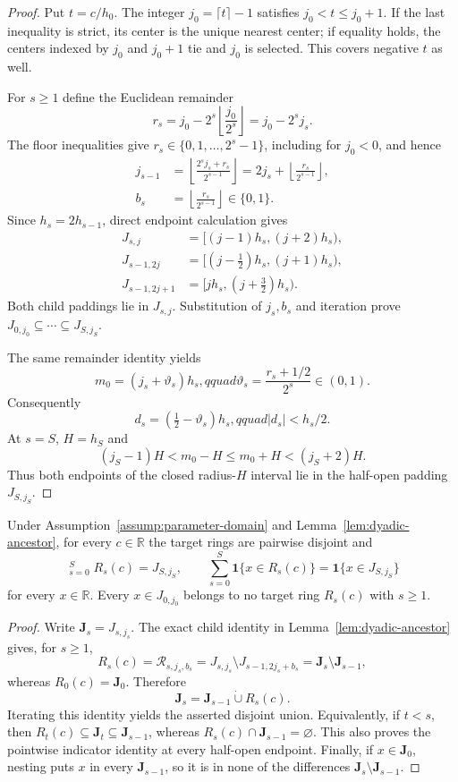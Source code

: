 \begin{proof}
Put $t=c/h_0$.  The integer $j_0=\lceil t\rceil-1$ satisfies
$j_0<t\leq j_0+1$.  If the last inequality is strict, its center is the
unique nearest center; if equality holds, the centers indexed by $j_0$ and
$j_0+1$ tie and $j_0$ is selected.  This covers negative $t$ as well.

For $s\geq1$ define the Euclidean remainder
\[
 r_s=j_0-2^s\left\lfloor\frac{j_0}{2^s}\right\rfloor
     =j_0-2^sj_s.
\]
The floor inequalities give $r_s\in\{0,1,\ldots,2^s-1\}$, including for
$j_0<0$, and hence
\[
\begin{aligned}
 j_{s-1}
 &=\left\lfloor\frac{2^sj_s+r_s}{2^{s-1}}\right\rfloor
 =2j_s+\left\lfloor\frac{r_s}{2^{s-1}}\right\rfloor,\\
 b_s&=\left\lfloor\frac{r_s}{2^{s-1}}\right\rfloor\in\{0,1\}.
\end{aligned}
\]
Since $h_s=2h_{s-1}$, direct endpoint calculation gives
\[
\begin{aligned}
 J_{s,j}&=[(j-1)h_s,(j+2)h_s),\\
 J_{s-1,2j}&=[(j-\tfrac12)h_s,(j+1)h_s),\\
 J_{s-1,2j+1}&=[jh_s,(j+\tfrac32)h_s).
\end{aligned}
\]
Both child paddings lie in $J_{s,j}$.  Substitution of $j_s,b_s$ and
iteration prove
$J_{0,j_0}\subseteq\cdots\subseteq J_{S,j_S}$.

The same remainder identity yields
\[
 m_0=(j_s+\vartheta_s)h_s,qquad
 \vartheta_s=\frac{r_s+1/2}{2^s}\in(0,1).
\]
Consequently
\[
 d_s=(\tfrac12-\vartheta_s)h_s,qquad |d_s|<h_s/2.
\]
At $s=S$, $H=h_S$ and
\[
 (j_S-1)H<m_0-H\leq m_0+H<(j_S+2)H.
\]
Thus both endpoints of the closed radius-$H$ interval lie in the half-open
padding $J_{S,j_S}$.
\end{proof}

\begin{proposition}\label{prop:ring-partition}
Under Assumption~\ref{assump:parameter-domain} and
Lemma~\ref{lem:dyadic-ancestor}, for every $c\in\mathbb R$ the target rings
are pairwise disjoint and
\[
 \mathop{\dot\bigcup}_{s=0}^S R_s(c)=J_{S,j_S},
 \qquad
 \sum_{s=0}^S\mathbf1\{x\in R_s(c)\}
 =\mathbf1\{x\in J_{S,j_S}\}
\]
for every $x\in\mathbb R$.  Every $x\in J_{0,j_0}$ belongs to no target
ring $R_s(c)$ with $s\geq1$.
\end{proposition}

\begin{proof}
Write $\mathbf J_s=J_{s,j_s}$.  The exact child identity in
Lemma~\ref{lem:dyadic-ancestor} gives, for $s\geq1$,
\[
 R_s(c)=\mathcal R_{s,j_s,b_s}
 =J_{s,j_s}\setminus J_{s-1,2j_s+b_s}
 =\mathbf J_s\setminus\mathbf J_{s-1},
\]
whereas $R_0(c)=\mathbf J_0$.  Therefore
\[
 \mathbf J_s=\mathbf J_{s-1}\mathbin{\dot\cup}R_s(c).
\]
Iterating this identity yields the asserted disjoint union.  Equivalently,
if $t<s$, then
$R_t(c)\subseteq\mathbf J_t\subseteq\mathbf J_{s-1}$, whereas
$R_s(c)\cap\mathbf J_{s-1}=\varnothing$.  This also proves the pointwise
indicator identity at every half-open endpoint.  Finally, if
$x\in\mathbf J_0$, nesting puts $x$ in every $\mathbf J_{s-1}$, so it is
in none of the differences $\mathbf J_s\setminus\mathbf J_{s-1}$.
\end{proof}

